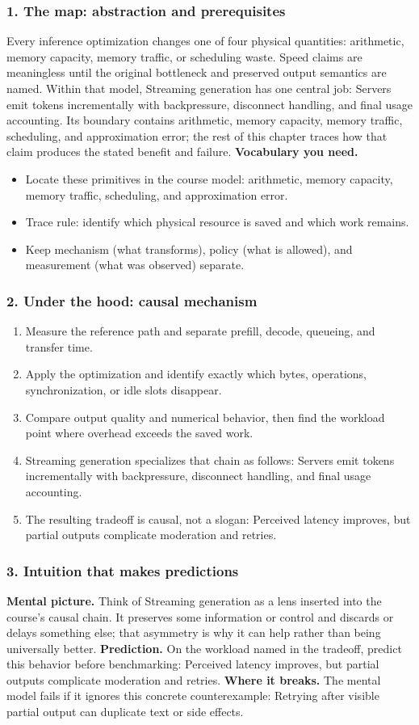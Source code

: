 \subsubsection*{1. The map: abstraction and prerequisites}
Every inference optimization changes one of four physical quantities: arithmetic, memory capacity, memory traffic, or scheduling waste. Speed claims are meaningless until the original bottleneck and preserved output semantics are named.
Within that model, Streaming generation has one central job: Servers emit tokens incrementally with backpressure, disconnect handling, and final usage accounting. Its boundary contains arithmetic, memory capacity, memory traffic, scheduling, and approximation error; the rest of this chapter traces how that claim produces the stated benefit and failure.
\textbf{Vocabulary you need.}\begin{itemize}
\item Locate these primitives in the course model: arithmetic, memory capacity, memory traffic, scheduling, and approximation error.
\item Trace rule: identify which physical resource is saved and which work remains.
\item Keep mechanism (what transforms), policy (what is allowed), and measurement (what was observed) separate.
\end{itemize}
\subsubsection*{2. Under the hood: causal mechanism}\begin{enumerate}
\item Measure the reference path and separate prefill, decode, queueing, and transfer time.
\item Apply the optimization and identify exactly which bytes, operations, synchronization, or idle slots disappear.
\item Compare output quality and numerical behavior, then find the workload point where overhead exceeds the saved work.
\item Streaming generation specializes that chain as follows: Servers emit tokens incrementally with backpressure, disconnect handling, and final usage accounting.
\item The resulting tradeoff is causal, not a slogan: Perceived latency improves, but partial outputs complicate moderation and retries.
\end{enumerate}
\subsubsection*{3. Intuition that makes predictions}
\textbf{Mental picture.} Think of Streaming generation as a lens inserted into the course's causal chain. It preserves some information or control and discards or delays something else; that asymmetry is why it can help rather than being universally better.
\textbf{Prediction.} On the workload named in the tradeoff, predict this behavior before benchmarking: Perceived latency improves, but partial outputs complicate moderation and retries.
\textbf{Where it breaks.} The mental model fails if it ignores this concrete counterexample: Retrying after visible partial output can duplicate text or side effects.

